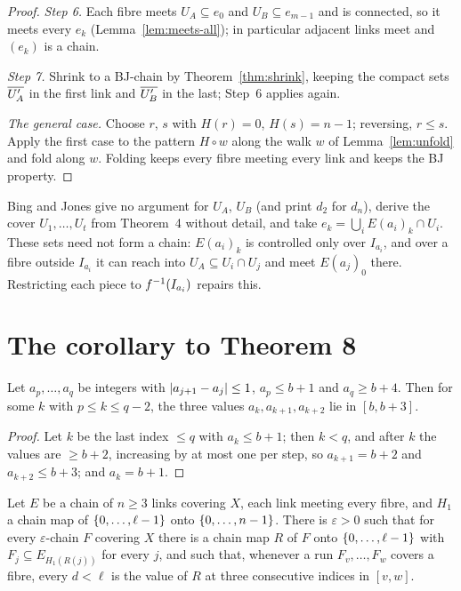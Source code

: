 \begin{proof}
\emph{Step 6.} Each fibre meets $U_A\subseteq e_0$ and $U_B\subseteq e_{m-1}$ and is connected, so it meets every $e_k$ (Lemma~\ref{lem:meets-all}); in particular adjacent
links meet and $(e_k)$ is a chain.

\emph{Step 7.} Shrink to a BJ-chain by Theorem~\ref{thm:shrink}, keeping the compact sets $\overline{U'_A}$ in the first link and $\overline{U'_B}$ in the last; Step~6 applies
again.

\emph{The general case.} Choose $r$, $s$ with $H(r)=0$, $H(s)=n-1$; reversing, $r\le s$. Apply the first case to the pattern $H\circ w$ along the walk $w$ of
Lemma~\ref{lem:unfold} and fold along $w$. Folding keeps every fibre meeting every link and keeps the BJ property.
\end{proof}


\begin{remark}
Bing and Jones give no argument for $U_A$, $U_B$ (and print $d_2$ for $d_n$), derive the cover $U_1,\dots,U_t$ from Theorem~4 without detail, and take
$e_k=\bigcup_iE(a_i)_k\cap U_i$. These sets need not form a chain: $E(a_i)_k$ is controlled only over $I_{a_i}$, and over a fibre outside $I_{a_i}$ it can reach into
$U_A\subseteq U_i\cap U_j$ and meet $E(a_j)_0$ there. Restricting each piece to $f^{-1}(I_{a_i})$ repairs this.
\end{remark}

\section{The corollary to Theorem 8}

\begin{lemma}\label{lem:walk-core}
Let $a_p,\dots,a_q$ be integers with $\left\lvert a_{j+1}-a_j\right\rvert\le1$, $a_p\le b+1$ and $a_q\ge b+4$. Then for some $k$ with $p\le k\le q-2$, the three values $a_k,a_{k+1},a_{k+2}$
lie in $[b,b+3]$.
\end{lemma}

\begin{proof}
Let $k$ be the last index $\le q$ with $a_k\le b+1$; then $k<q$, and after $k$ the values are $\ge b+2$, increasing by at most one per step, so $a_{k+1}=b+2$ and
$a_{k+2}\le b+3$; and $a_k=b+1$.
\end{proof}


\begin{corollary}\label{cor:bj8}
Let $E$ be a chain of $n\ge3$ links covering $X$, each link meeting every fibre, and $H_1$ a chain map of $\left\{ 0,\dots,\ell-1 \right\}$ onto $\left\{ 0,\dots,n-1 \right\}$. There is
$\varepsilon>0$ such that for every $\varepsilon$-chain $F$ covering $X$ there is a chain map $R$ of $F$ onto $\left\{ 0,\dots,\ell-1 \right\}$ with $F_j\subseteq E_{H_1(R(j))}$ for every
$j$, and such that, whenever a run $F_v,\dots,F_w$ covers a fibre, every $d<\ell$ is the value of $R$ at three consecutive indices in $[v,w]$.
\end{corollary}

